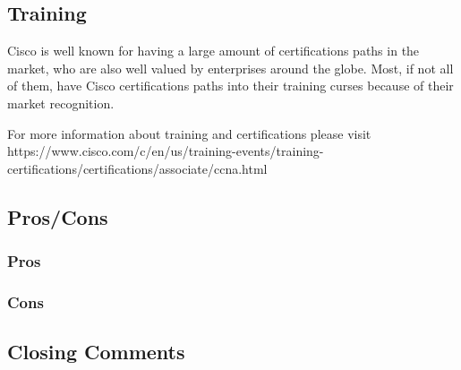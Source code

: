 \subsection{Training}

Cisco is well known for having a large amount of certifications paths in the market, who are also well valued by enterprises around the globe. Most, if not all of them, have Cisco certifications paths into their training curses because of their market recognition. 

For more information about training and certifications please visit https://www.cisco.com/c/en/us/training-events/training-certifications/certifications/associate/ccna.html

\subsection{Pros/Cons}
\subsubsection{Pros}
\subsubsection{Cons}
\subsection{Closing Comments}
